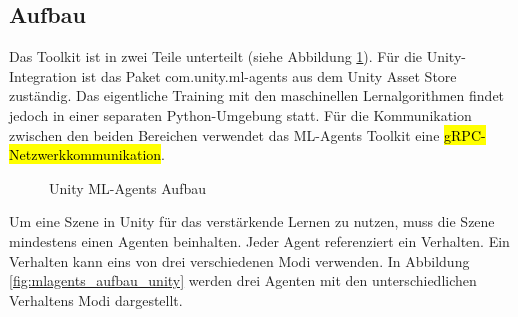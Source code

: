 \subsection{Aufbau}
Das Toolkit ist in zwei Teile unterteilt (siehe Abbildung \ref{fig:mlagents_aufbau}). Für die Unity-Integration ist das Paket com.unity.ml-agents aus dem Unity Asset Store zuständig. Das eigentliche Training mit den maschinellen Lernalgorithmen findet jedoch in einer separaten Python-Umgebung statt. Für die Kommunikation zwischen den beiden Bereichen verwendet das ML-Agents Toolkit eine \hl{gRPC-Netzwerkkommunikation}.\cite{juliani2020}

\begin{figure}[H]
  \centering  
  \caption{Unity ML-Agents Aufbau}
  \label{fig:mlagents_aufbau}
\end{figure}

Um eine Szene in Unity für das verstärkende Lernen zu nutzen, muss die Szene mindestens einen Agenten beinhalten. Jeder Agent referenziert ein Verhalten. Ein Verhalten kann eins von drei verschiedenen Modi verwenden. In Abbildung \ref{fig:mlagents_aufbau_unity} werden drei Agenten mit den unterschiedlichen Verhaltens Modi dargestellt.

